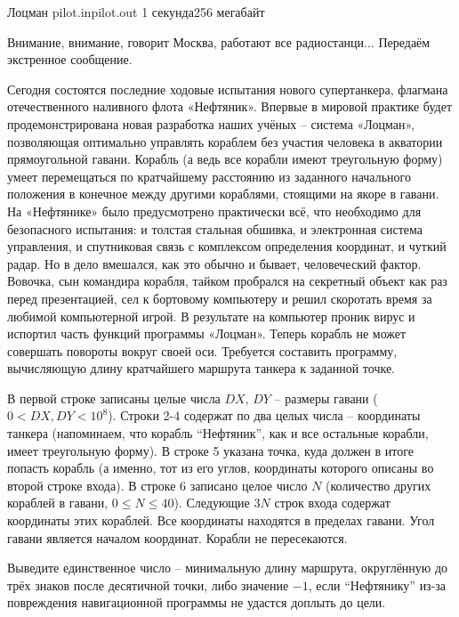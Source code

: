 
\begin{problem}{Лоцман}
{pilot.in}{pilot.out}
{1 секунда}{256 мегабайт}{}

Внимание, внимание, говорит Москва, работают все радиостанци... Передаём экстренное сообщение.

Сегодня состоятся последние ходовые испытания нового супертанкера, флагмана отечественного наливного флота «Нефтяник». Впервые в мировой практике будет продемонстрирована новая разработка наших учёных -- система «Лоцман», позволяющая оптимально управлять кораблем без участия человека в акватории прямоугольной гавани. Корабль (а ведь все корабли имеют треугольную форму) умеет перемещаться по кратчайшему расстоянию из заданного начального положения в конечное между другими кораблями, стоящими на якоре в гавани. На «Нефтянике» было предусмотрено практически всё, что необходимо для безопасного испытания: и толстая стальная обшивка, и электронная система управления, и спутниковая связь с комплексом определения координат, и чуткий радар. Но в дело вмешался, как это обычно и бывает, человеческий фактор. Вовочка, сын командира корабля, тайком пробрался на секретный объект как раз перед презентацией, сел к бортовому компьютеру и решил скоротать время за любимой компьютерной игрой. В результате на компьютер проник вирус и испортил часть функций программы «Лоцман». Теперь корабль не может совершать повороты вокруг своей оси. Требуется составить программу, вычисляющую длину кратчайшего маршрута танкера к заданной точке.

\InputFile

В первой строке записаны целые числа $DX$, $DY$ -- размеры гавани ($0 < DX, DY < 10^8$). 
Строки 2-4 содержат по два целых числа -- координаты танкера (напоминаем, что корабль ``Нефтяник'', как и все остальные корабли, имеет треугольную форму). 
В строке 5 указана точка, куда должен в итоге попасть корабль (а именно, тот из его углов, координаты которого описаны во второй строке входа). 
В строке 6 записано целое число $N$ (количество других кораблей в гавани, $0 \le N \le 40$). 
Следующие $3N$ строк входа содержат координаты этих кораблей. 
Все координаты находятся в пределах гавани. Угол гавани является началом координат. Корабли не пересекаются.

\OutputFile

Выведите единственное число -- минимальную длину маршрута, округлённую до трёх знаков после десятичной точки, либо значение 
$-1$, если ``Нефтянику'' из-за повреждения навигационной программы не удастся доплыть до цели.

\Examples

\begin{example}
%
\end{example}

\end{problem}
